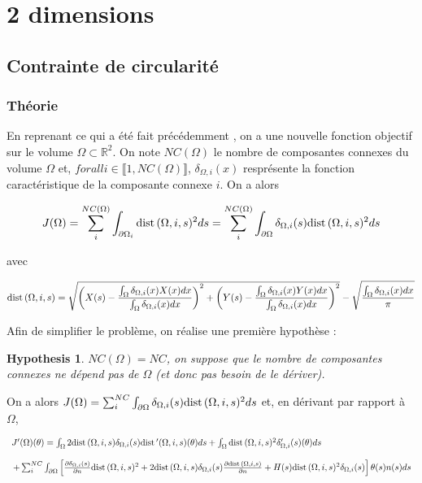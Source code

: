 \documentclass[11pt,a4paper]{article}
\newtheorem{hypothese}[theorem]{Hypothesis}
\begin{document}
\section{2 dimensions}

\subsection{Contrainte de circularité}

\subsubsection{Théorie}

En reprenant ce qui a été fait précédemment , on a une nouvelle fonction objectif sur le volume $\Omega \subset \mathbb{R}^2$. On note $NC(\Omega)$ le nombre de composantes connexes du volume $\Omega$ et, $forall i\in\llbracket 1, NC(\Omega) \rrbracket$, $\delta_{\Omega,i}(x)$ resprésente la fonction caractéristique de la composante connexe $i$. On a alors 

\begin{equation}
J(\Omega)=\sum_{i}^{NC(\Omega)}\int_{\partial\Omega_{i}} \textrm{dist}\,(\Omega,i,s)^2ds=\sum_{i}^{NC(\Omega)}\int_{\partial\Omega} \delta_{\Omega,i}(s)\textrm{dist}\,(\Omega,i,s)^2ds
\end{equation}

avec 

\begin{equation}
\textrm{dist}\,(\Omega,i,s)=\sqrt{\left(X(s)-\frac{\int_{\Omega} \delta_{\Omega,i}(x)X(x)dx}{\int_{\Omega} \delta_{\Omega,i}(x)dx}\right)^2+\left(Y(s)-\frac{\int_{\Omega} \delta_{\Omega,i}(x)Y(x)dx}{\int_{\Omega} \delta_{\Omega,i}(x)dx}\right)^2}-\sqrt{\frac{\int_{\Omega} \delta_{\Omega,i}(x)dx}{\pi}}
\end{equation}

Afin de simplifier le problème, on réalise une première hypothèse :

\begin{hypothese}
	\label{hyp:H1}
	$NC(\Omega)=NC$, on suppose que le nombre de composantes connexes ne dépend pas de $\Omega$ (et donc pas besoin de le dériver).
\end{hypothese}


On a alors $J(\Omega)=\sum_{i}^{NC}\int_{\partial\Omega} \delta_{\Omega,i}(s)\textrm{dist}\,(\Omega,i,s)^2ds$ et, en dérivant par rapport à $\Omega$,

\begin{equation}
\begin{array}{l}
J'(\Omega)(\theta)=\int_{\Omega} 2\textrm{dist}\,(\Omega,i,s)\delta_{\Omega,i}(s)\textrm{dist}\, '(\Omega,i,s)(\theta)ds+\int_{\Omega} \textrm{dist}\,(\Omega,i,s)^2\delta_{\Omega,i}'(s)(\theta)ds\\
\\
\, +\sum_{i}^{NC}\int_{\partial\Omega} \left[\frac{\partial \delta_{\Omega,i}(s)}{\partial n}\textrm{dist}\,(\Omega,i,s)^2+2\textrm{dist}\,(\Omega,i,s)\delta_{\Omega,i}(s)\frac{\partial\textrm{dist}\,(\Omega,i,s)}{\partial n}+H(s)\textrm{dist}\,(\Omega,i,s)^2\delta_{\Omega,i}(s)\right]\theta(s)n(s)ds
\end{array}
\end{equation}
\end{document}
